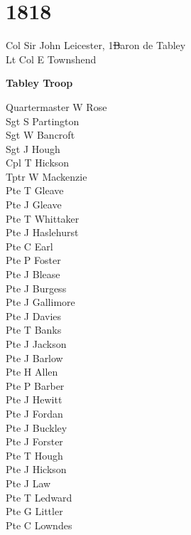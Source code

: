 \chapter*{1818}

\begin{multicols}{2}
  \noindent
  Col Sir John Leicester, 1\st Baron de Tabley \\
  Lt Col E Townshend \\
\end{multicols}

\begin{center}
  \Large
  \textbf{Tabley Troop}
\end{center}

\begin{multicols}{2}
  \noindent
  Quartermaster W Rose \\
  Sgt S Partington \\
  Sgt W Bancroft \\
  Sgt J Hough \\
  Cpl T Hickson \\
  Tptr W Mackenzie \\
  Pte T Gleave \\
  Pte J Gleave \\
  Pte T Whittaker \\
  Pte J Haslehurst \\
  Pte C Earl \\
  Pte P Foster \\
  Pte J Blease \\
  Pte J Burgess \\
  Pte J Gallimore \\
  Pte J Davies \\
  Pte T Banks \\
  Pte J Jackson \\
  Pte J Barlow \\
  Pte H Allen \\
  Pte P Barber \\
  Pte J Hewitt \\
  Pte J Fordan \\
  Pte J Buckley \\
  Pte J Forster \\
  Pte T Hough \\
  Pte J Hickson \\
  Pte J Law \\
  Pte T Ledward \\
  Pte G Littler \\
  Pte C Lowndes \\

\end{multicols}

